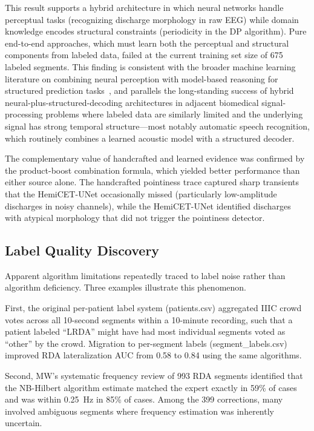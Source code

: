 \documentclass{iopjournal}
\begin{document}
This result supports a hybrid architecture in which neural networks handle perceptual tasks (recognizing discharge morphology in raw EEG) while domain knowledge encodes structural constraints (periodicity in the DP algorithm). Pure end-to-end approaches, which must learn both the perceptual and structural components from labeled data, failed at the current training set size of 675 labeled segments. This finding is consistent with the broader machine learning literature on combining neural perception with model-based reasoning for structured prediction tasks~\cite{lake2017}, and parallels the long-standing success of hybrid neural-plus-structured-decoding architectures in adjacent biomedical signal-processing problems where labeled data are similarly limited and the underlying signal has strong temporal structure---most notably automatic speech recognition, which routinely combines a learned acoustic model with a structured decoder.

The complementary value of handcrafted and learned evidence was confirmed by the product-boost combination formula, which yielded better performance than either source alone. The handcrafted pointiness trace captured sharp transients that the HemiCET-UNet occasionally missed (particularly low-amplitude discharges in noisy channels), while the HemiCET-UNet identified discharges with atypical morphology that did not trigger the pointiness detector.

\subsection{Label Quality Discovery}
\label{sec:label_quality}

Apparent algorithm limitations repeatedly traced to label noise rather than algorithm deficiency. Three examples illustrate this phenomenon.

First, the original per-patient label system (patients.csv) aggregated IIIC crowd votes across all 10-second segments within a 10-minute recording, such that a patient labeled ``LRDA'' might have had most individual segments voted as ``other'' by the crowd. Migration to per-segment labels (segment\_labels.csv) improved RDA lateralization AUC from 0.58 to 0.84 using the same algorithms.

Second, MW's systematic frequency review of 993 RDA segments identified that the NB-Hilbert algorithm estimate matched the expert exactly in 59\% of cases and was within 0.25~Hz in 85\% of cases. Among the 399 corrections, many involved ambiguous segments where frequency estimation was inherently uncertain.
\end{document}
